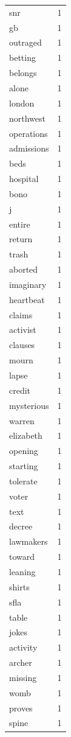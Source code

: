 \begin{tabular}{lr}
snr & 1 \\
gb & 1 \\
outraged & 1 \\
betting & 1 \\
belongs & 1 \\
alone & 1 \\
london & 1 \\
northwest & 1 \\
operations & 1 \\
admissions & 1 \\
beds & 1 \\
hospital & 1 \\
bono & 1 \\
j & 1 \\
entire & 1 \\
return & 1 \\
trash & 1 \\
aborted & 1 \\
imaginary & 1 \\
heartbeat & 1 \\
claims & 1 \\
activist & 1 \\
clauses & 1 \\
mourn & 1 \\
lapse & 1 \\
credit & 1 \\
mysterious & 1 \\
warren & 1 \\
elizabeth & 1 \\
opening & 1 \\
starting & 1 \\
tolerate & 1 \\
voter & 1 \\
text & 1 \\
decree & 1 \\
lawmakers & 1 \\
toward & 1 \\
leaning & 1 \\
shirts & 1 \\
sfla & 1 \\
table & 1 \\
jokes & 1 \\
activity & 1 \\
archer & 1 \\
missing & 1 \\
womb & 1 \\
proves & 1 \\
spine & 1 \\

\end{tabular}
